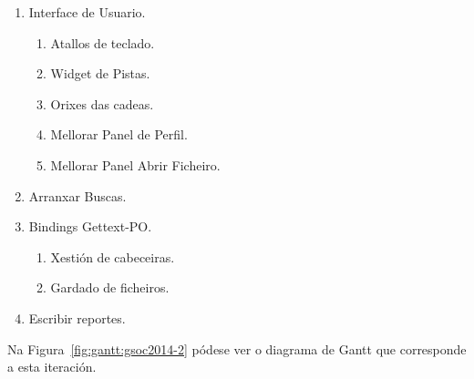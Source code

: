 \begin{enumerate}[label=\bfseries WBS 2.\arabic*]
  \item Interface de Usuario.
    \begin{enumerate}[label=\bfseries WBS 2.1.\arabic*]
      \item Atallos de teclado.
      \item Widget de Pistas.
      \item Orixes das cadeas.
      \item Mellorar Panel de Perfil.
      \item Mellorar Panel Abrir Ficheiro.
    \end{enumerate}
  \item Arranxar Buscas.
  \item Bindings Gettext-PO.
    \begin{enumerate}[label=\bfseries WBS 2.3.\arabic*]
      \item Xestión de cabeceiras.
      \item Gardado de ficheiros.
    \end{enumerate}
  \item Escribir reportes.
\end{enumerate}

Na Figura~\ref{fig:gantt:gsoc2014-2} pódese ver o diagrama de Gantt que corresponde a esta iteración.

